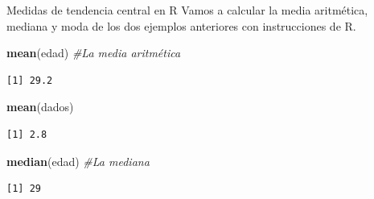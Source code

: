 \documentclass[
  ignorenonframetext,
  aspectratio=169]{beamer}
\newenvironment{Shaded}{\begin{snugshade}}{\end{snugshade}}
\newcommand{\CommentTok}[1]{\textcolor[rgb]{0.56,0.35,0.01}{\textit{#1}}}
\newcommand{\FunctionTok}[1]{\textcolor[rgb]{0.13,0.29,0.53}{\textbf{#1}}}
\newcommand{\NormalTok}[1]{#1}
\begin{document}
\begin{frame}[fragile]{Medidas de tendencia central en R}
\label{medidas-de-tendencia-central-en-r}
Vamos a calcular la media aritmética, mediana y moda de los dos ejemplos
anteriores con instrucciones de R.

\begin{Shaded}
\begin{Highlighting}[]
\FunctionTok{mean}\NormalTok{(edad) }\CommentTok{\#La media aritmética}
\end{Highlighting}
\end{Shaded}

\begin{verbatim}
[1] 29.2
\end{verbatim}

\begin{Shaded}
\begin{Highlighting}[]
\FunctionTok{mean}\NormalTok{(dados)}
\end{Highlighting}
\end{Shaded}

\begin{verbatim}
[1] 2.8
\end{verbatim}

\begin{Shaded}
\begin{Highlighting}[]
\FunctionTok{median}\NormalTok{(edad) }\CommentTok{\#La mediana}
\end{Highlighting}
\end{Shaded}

\begin{verbatim}
[1] 29
\end{verbatim}
\end{frame}
\end{document}
